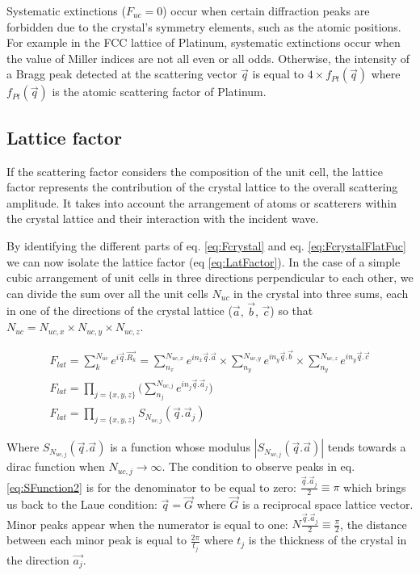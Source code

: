 Systematic extinctions ($F_{uc} = 0$) occur when certain diffraction peaks are forbidden due to the crystal's symmetry elements, such as the atomic positions.
For example in the FCC lattice of Platinum, systematic extinctions occur when the value of Miller indices are not all even or all odds.
Otherwise, the intensity of a Bragg peak detected at the scattering vector $\vec{q}$ is equal to $4\times f_{Pt}(\vec{q})$ where $f_{Pt}(\vec{q})$ is the atomic scattering factor of Platinum.

\subsection{Lattice factor} \label{sec:LatticeFactor}

If the scattering factor considers the composition of the unit cell, the lattice factor represents the contribution of the crystal lattice to the overall scattering amplitude.
It takes into account the arrangement of atoms or scatterers within the crystal lattice and their interaction with the incident wave.

By identifying the different parts of eq. \ref{eq:Fcrystal} and eq. \ref{eq:FcrystalFlatFuc} we can now isolate the lattice factor (eq \ref{eq:LatFactor}).
In the case of a simple cubic arrangement of unit cells in three directions perpendicular to each other, we can divide the sum over all the unit cells $N_{uc}$ in the crystal into three sums, each in one of the directions of the crystal lattice ($\vec{a}, \, \vec{b}, \, \vec{c}$) so that $N_{uc} = N_{uc, x} \times N_{uc, y} \times N_{uc, z}$.

\begin{gather}
    \label{eq:LatFactor}
    F_{lat} = \sum_k^{N_{uc}} e^{i\vec{q}.\vec{R_k}} = \sum_{n_x}^{N_{uc, x}} e^{i n_x\vec{q}.\vec{a}} \times \sum_{n_y}^{N_{uc, y}} e^{i n_y\vec{q}.\vec{b}} \times \sum_{n_y}^{N_{uc, z}} e^{i n_y\vec{q}.\vec{c}}\\
    F_{lat} = \prod_{j=\{x,y,z\}} \Bigg( \sum_{n_j}^{N_{uc, j}} e^{i n_j\vec{q}.\vec{a}_j} \Bigg)\\
    F_{lat} = \prod_{j=\{x,y,z\}} S_{N_{uc, j}}(\vec{q}.\vec{a}_j)
\end{gather}

Where $S_{N_{uc, j}}(\vec{q}.\vec{a})$ is a function whose modulus $|S_{N_{uc, j}}(\vec{q}.\vec{a})|$ tends towards a dirac function when $N_{uc, j} \longrightarrow \infty$.
The condition to observe peaks in eq. \ref{eq:SFunction2} is for the denominator to be equal to zero: $\frac{\vec{q}.\vec{a}_j}{2} \equiv \pi$ which brings us back to the Laue condition: $\vec{q} = \vec{G}$ where $\vec{G}$ is a reciprocal space lattice vector.
Minor peaks appear when the numerator is equal to one: $N\frac{\vec{q}.\vec{a}_j}{2} \equiv \frac{\pi}{2}$, the distance between each minor peak is equal to $\frac{2\pi}{t_j}$ where $t_j$ is the thickness of the crystal in the direction $\vec{a_j}$.

